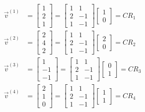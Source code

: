 \begin{align*}
\vec{v}^{(1)} &= 
\begin{bmatrix}
1 \\
2 \\
1
\end{bmatrix}
=
\begin{bmatrix}
1 & 1 \\
2 & -1 \\
1 & -1
\end{bmatrix}
\begin{bmatrix}
1 \\
0
\end{bmatrix}
= CR_1 \\
\vec{v}^{(2)} &= 
\begin{bmatrix}
2 \\
4 \\
2
\end{bmatrix}
=
\begin{bmatrix}
1 & 1 \\
2 & -1 \\
1 & -1
\end{bmatrix}
\begin{bmatrix}
2 \\
0
\end{bmatrix}
= CR_2 \\
\vec{v}^{(3)} &= 
\begin{bmatrix}
1 \\
-1 \\
-1
\end{bmatrix}
=
\begin{bmatrix}
1 & 1 \\
2 & -1 \\
1 & -1
\end{bmatrix}
\begin{bmatrix}
0 \\
1
\end{bmatrix}
= CR_3 \\
\vec{v}^{(4)} &= 
\begin{bmatrix}
2 \\
1 \\
0
\end{bmatrix}
=
\begin{bmatrix}
1 & 1 \\
2 & -1 \\
1 & -1
\end{bmatrix}
\begin{bmatrix}
1 \\
1
\end{bmatrix}
= CR_4
\end{align*}
